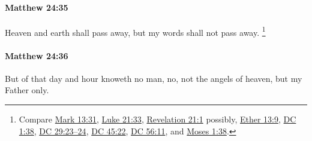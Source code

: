 		\paragraph{Matthew 24:35} %
			\label{MATTHEW-24-35}

			Heaven and earth shall pass away, but my words shall not pass away.%
				\footnote{%
					Compare \hyperref[MARK-13-31]{Mark 13:31}, \hyperref[LUKE-21-33]{Luke 21:33}, \hyperref[REVELATIONNT-21-1]{Revelation 21:1} possibly, \hyperref[ETHER-13-9]{Ether 13:9}, \hyperref[DC1-38]{DC 1:38}, \hyperref[DC29-23]{DC 29:23--24}, \hyperref[DC45-22]{DC 45:22}, \hyperref[DC56-11]{DC 56:11}, and \hyperref[MOSES-1-38]{Moses 1:38}.
					}

			\begin{framed}
			\scriptsize
				\begin{compactdesc}
					\item[SBLG] 
				\end{compactdesc}
			\end{framed}

		\paragraph{Matthew 24:36} %
			\label{MATTHEW-24-36}

			But of that day and hour knoweth no man, no, not the angels of heaven, but my Father only.

